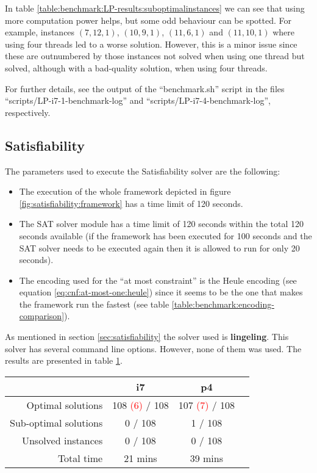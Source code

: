 In table \ref{table:benchmark:LP-results:suboptimalinstances} we can see that using more
computation power helps, but some odd behaviour can be spotted. For example,
instances $(7,12,1)$, $(10,9,1)$, $(11,6,1)$ and $(11,10,1)$  where using four
threads led to a worse solution. However, this is a minor issue since these are
outnumbered by those instances not solved when using one thread but solved,
although with a bad-quality solution, when using four threads.

\hfill

For further details, see the output of the ``benchmark.sh'' script in the files
``scripts/LP-i7-1-benchmark-log'' and ``scripts/LP-i7-4-benchmark-log'', respectively.

\subsection{Satisfiability}
\label{sec:benchmarking:satisfiability}

The parameters used to execute the Satisfiability solver are the following:
\begin{itemize}
	\item The execution of the whole framework depicted in figure \ref{fig:satisfiability:framework}
	has a time limit of 120 seconds.
	\item The SAT solver module has a time limit of 120 seconds within the total 120 seconds
	available (if the framework has been executed for 100 seconds and the SAT solver needs
	to be executed again then it is allowed to run for only 20 seconds).
	\item The encoding used for the ``at most constraint'' is the Heule encoding 
	(see equation \ref{eq:cnf:at-most-one:heule}) since it seems to be the one that makes the framework
	run the fastest (see table \ref{table:benchmark:encoding-comparison}).
\end{itemize}

As mentioned in section \ref{sec:satisfiability} the solver used is \textbf{lingeling}\cite{lingeling}.
This solver has several command line options. However, none of them was used. The results
are presented in table \ref{table:benchmark:SAT-results}.

\begin{table}[H]
\centering
	\begin{tabular}{rccc}
								& i7 	& p4 \\
		\midrule
		Optimal solutions		& 108 \textcolor{red}{(6)} / 108
											& 107 \textcolor{red}{(7)} / 108 \\
		Sub-optimal solutions	& 0 / 108	& 1 / 108 \\
		Unsolved instances		& 0 / 108	& 0 / 108 \\
		Total time				& 21 mins	& 39 mins \\
	\end{tabular}
	\label{table:benchmark:SAT-results}
\end{table}


